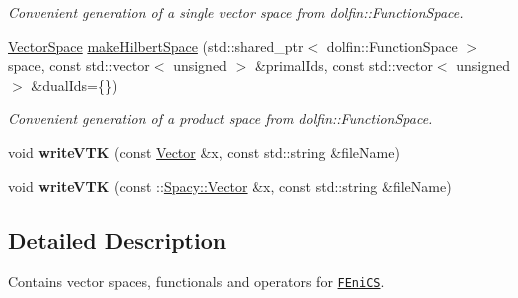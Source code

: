 \begin{DoxyCompactItemize}
\begin{DoxyCompactList}\small\item\em Convenient generation of a single vector space from dolfin\-::\-Function\-Space. \end{DoxyCompactList}\item 
\hyperlink{classSpacy_1_1VectorSpace}{Vector\-Space} \hyperlink{group__FenicsGroup_ga79df66c976cab487d2013de25c17bb39}{make\-Hilbert\-Space} (std\-::shared\-\_\-ptr$<$ dolfin\-::\-Function\-Space $>$ space, const std\-::vector$<$ unsigned $>$ \&primal\-Ids, const std\-::vector$<$ unsigned $>$ \&dual\-Ids=\{\})
\begin{DoxyCompactList}\small\item\em Convenient generation of a product space from dolfin\-::\-Function\-Space. \end{DoxyCompactList}\item 
\hypertarget{namespaceSpacy_1_1FEniCS_a9a327f617c26b4ea7b8d3fb68236cf6d}{void {\bfseries write\-V\-T\-K} (const \hyperlink{classSpacy_1_1FEniCS_1_1Vector}{Vector} \&x, const std\-::string \&file\-Name)}\label{namespaceSpacy_1_1FEniCS_a9a327f617c26b4ea7b8d3fb68236cf6d}

\item 
\hypertarget{namespaceSpacy_1_1FEniCS_a6e2e0e8c0892338ec1cda88d75824086}{void {\bfseries write\-V\-T\-K} (const \-::\hyperlink{classSpacy_1_1Vector}{Spacy\-::\-Vector} \&x, const std\-::string \&file\-Name)}\label{namespaceSpacy_1_1FEniCS_a6e2e0e8c0892338ec1cda88d75824086}

\end{DoxyCompactItemize}


\subsection{Detailed Description}
Contains vector spaces, functionals and operators for \href{www.fenicsproject.org}{\tt F\-Eni\-C\-S}. 

